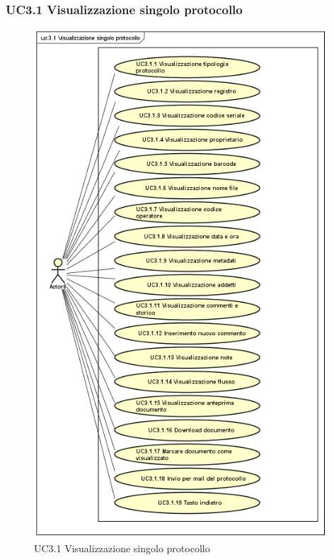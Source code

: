 \subsubsection{UC3.1 Visualizzazione singolo protocollo}
    \label{UC3.1}
    \begin{figure}[!h] 
        \centering 
        \includegraphics[width = 11cm]{immagini/UseCase/dettaglioprotocollo.png}
        \caption{UC3.1 Visualizzazione singolo protocollo}
    \end{figure}
    
